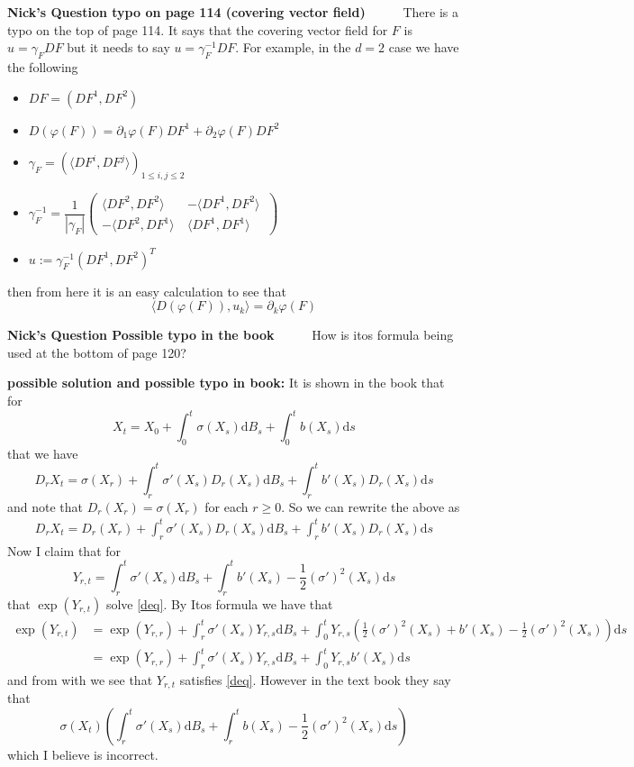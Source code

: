 \documentclass[a4paper,11pt]{article}
\numberwithin{equation}{section}
\theoremstyle{plain}
\theoremstyle{definition}
\newcommand{\ud}{\ensuremath{\mathrm{d}}}
\newcounter{NQ}
\newenvironment{NickQuestion}[1][] %
{\refstepcounter{NQ}
	\begin{mdframed}[backgroundcolor=lightgray]\textbf{Nick's Question \theNQ \: #1~~}~~~\noindent}%
	{\end{mdframed}}
\numberwithin{NQ}{section}
\numberwithin{LQ}{section}
\numberwithin{ZQ}{section}
\begin{document}
\begin{NickQuestion}[typo on page 114 (covering  vector field)]
	There is a typo on the top of page 114. It says that the covering vector field for $F$ is $u=\gamma_FDF$ but it needs to say $u=\gamma_F^{-1}DF$. For example, in the $d=2$ case we have the following 
	\begin{itemize}
		\item $DF = (DF^1,DF^2)$
		\item $D(\varphi(F)) = \partial_1\varphi(F)DF^1 + \partial_2\varphi(F)DF^2$
		\item $\gamma_F = \left(\langle DF^i, DF^j \rangle\right)_{1 \le i,j \le 2}$
		\item $ \gamma_F^{-1} = \dfrac{1}{|\gamma_F|}
		\begin{pmatrix}
			\langle DF^2, DF^2\rangle\ & -\langle DF^1, DF^2 \rangle\
			\\ -\langle DF^2, DF^1 \rangle\ & \langle DF^1, DF^1 \rangle\
		\end{pmatrix}$
		\item $u := \gamma_F^{-1}(DF^1,DF^2)^T$
	\end{itemize}
then from here it is an easy calculation to see that 
\[
	\langle D(\varphi(F)), u_k \rangle = \partial_k\varphi(F)
\]
\end{NickQuestion}

\begin{NickQuestion}[Possible typo in the book]
	How is itos formula being used at the bottom of page 120?
\end{NickQuestion}
\textbf{possible solution and possible typo in book:} 
It is shown in the book that for 
\[
X_t = X_0 + \int_0^t \sigma(X_s)\ud B_s + \int_0^t b(X_s) \ud s
\]
that we have 
\[
	D_rX_t = \sigma(X_r) + \int_r^t \sigma'(X_s)D_r(X_s) \ud B_s  + \int_r^t b'(X_s)D_r(X_s) \ud s
\]
and note that $D_r(X_r) = \sigma(X_r)$ for each $r \ge 0$. So we can rewrite the above as 
\begin{align} \label{deq}
		D_rX_t = D_r(X_r) + \int_r^t \sigma'(X_s)D_r(X_s) \ud B_s  + \int_r^t b'(X_s)D_r(X_s) \ud s
\end{align}
Now I claim that for
\[
	Y_{r,t} =  \int_r^t \sigma'(X_s) \ud B_s + \int_r^t b'(X_s) - \frac{1}{2}(\sigma')^2(X_s) \ud s 
\]
that $\exp(Y_{r,t})$ solve \eqref{deq}. By Itos formula we have that 
\begin{align*}
	\exp(Y_{r,t}) & = \exp(Y_{r,r})  +  \int_r^t \sigma'(X_s)Y_{r,s} \ud B_s + \int_0^t Y_{r,s} \left(\frac{1}{2}(\sigma')^2(X_s)+b'(X_s) -\frac{1}{2}(\sigma')^2(X_s)\right) \ud s
	\\& = \exp(Y_{r,r})  +  \int_r^t \sigma'(X_s)Y_{r,s} \ud B_s + \int_0^t Y_{r,s} b'(X_s)\ud s
\end{align*}
and from with we see that $Y_{r,t}$ satisfies \eqref{deq}. However in the text book they say that 
\[
\sigma(X_t) \left( \int_r^t \sigma'(X_s) \ud B_s + \int_r^t b(X_s) - \frac{1}{2}(\sigma')^2(X_s) \ud s \right)
\]
which I believe is incorrect. 
\end{document}

